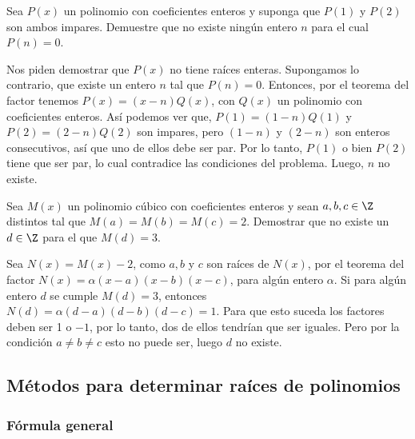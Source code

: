 \begin{example}
    Sea $P(x)$ un polinomio con coeficientes enteros y suponga que $P(1)$ y $P(2)$ son ambos impares.
    Demuestre que no existe ningún entero $n$ para el cual $P(n) = 0$.
\end{example}
\begin{solution}
    Nos piden demostrar que $P(x)$ no tiene raíces enteras.
    Supongamos lo contrario, que existe un entero $n$ tal que $P(n) = 0$.
    Entonces, por el teorema del factor tenemos $P(x) = (x - n)Q(x)$, con $Q(x)$ un polinomio con coeficientes enteros.
    Así podemos ver que, $P(1) = (1 - n)Q(1)$ y $P(2) = (2 - n)Q(2)$ son impares, pero $(1 - n)$ y $(2 - n)$ son enteros consecutivos, así que uno de ellos debe ser par.
    Por lo tanto, $P(1)$ o bien $P(2)$ tiene que ser par, lo cual contradice las condiciones del problema.
    Luego, $n$ no existe.
\end{solution}

\begin{example}
    Sea $M(x)$ un polinomio cúbico con coeficientes enteros y sean $a, b, c \in \Z$ distintos tal que $M(a) = M(b) = M(c) = 2$.
    Demostrar que no existe un $d \in \Z$ para el que $M(d) = 3.$
\end{example}
\begin{solution}
    Sea $N(x) = M(x) - 2$, como $a, b$ y $c$ son raíces de $N(x)$, por el teorema del factor $N(x) = \alpha (x - a)(x - b)(x - c)$, para algún entero $\alpha$.
    Si para algún entero $d$ se cumple $M(d) = 3$, entonces $N(d) = \alpha (d - a)(d - b)(d - c) = 1$.
    Para que esto suceda los factores deben ser 1 o $-1$, por lo tanto, dos de ellos tendrían que ser iguales.
    Pero por la condición $a \neq b \neq c$ esto no puede ser, luego $d$ no existe.
\end{solution}



\subsection{Métodos para determinar raíces de polinomios}

\subsubsection{Fórmula general}

